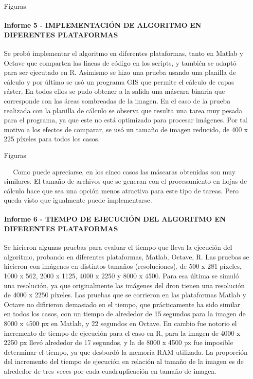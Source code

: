 Figuras

\paragraph{Informe 5 - IMPLEMENTACIÓN DE ALGORITMO EN DIFERENTES PLATAFORMAS}
Se probó implementar el algoritmo en diferentes plataformas, tanto en Matlab y Octave que comparten las líneas de código en los scripts, y también se adaptó para ser ejecutado en R. Asimismo se hizo una prueba usando una planilla de cálculo y por último se usó un programa GIS que permite el cálculo de capas ráster. En todos ellos se pudo obtener a la salida una máscara binaria que corresponde con las áreas sombreadas de la imagen. En el caso de la prueba realizada con la planilla de cálculo se observa que resulta una tarea muy pesada para el programa, ya que este no está optimizado para procesar imágenes. Por tal motivo a los efectos de comparar, se usó un tamaño de imagen reducido, de 400 x 225 píxeles para todos los casos.


Figuras

 
Como puede apreciarse, en los cinco casos las máscaras obtenidas son muy similares. El tamaño de archivos que se generan con el procesamiento en hojas de cálculo hace que sea una opción menos atractiva para este tipo de tareas. Pero queda visto que igualmente puede implementarse.

\paragraph{Informe 6 - TIEMPO DE EJECUCIÓN DEL ALGORITMO EN DIFERENTES PLATAFORMAS}
Se hicieron algunas pruebas para evaluar el tiempo que lleva la ejecución del algoritmo, probando en diferentes plataformas, Matlab, Octave, R. Las pruebas se hicieron con imágenes en distintos tamaños (resoluciones), de 500 x 281 píxeles, 1000 x 562, 2000 x 1125, 4000 x 2250 y 8000 x 4500. Para esa última se simuló una resolución, ya que originalmente las imágenes del dron tienen una resolución de 4000 x 2250 píxeles. Las pruebas que se corrieron en las plataformas Matlab y Octave no difirieron demasiado en el tiempo, que prácticamente ha sido similar en todos los casos, con un tiempo de alrededor de 15 segundos para la imagen de 8000 x 4500 px en Matlab, y 22 segundos en Octave. En cambio fue notorio el incremento de tiempo de ejecución para el caso en R, para la imagen de 4000 x 2250 px llevó alrededor de 17 segundos, y la de 8000 x 4500 px fue imposible determinar el tiempo, ya que desbordó la memoria RAM utilizada. La proporción del incremento del tiempo de ejecución en relación al tamaño de la imagen es de alrededor de tres veces por cada cuadruplicación en tamaño de imagen.


